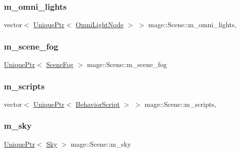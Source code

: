 \subsubsection{\texorpdfstring{m\+\_\+omni\+\_\+lights}{m\_omni\_lights}}
{\footnotesize\ttfamily vector$<$ \hyperlink{namespacemage_a3316d7143a973e37adf1110f2e80ca31}{Unique\+Ptr}$<$ \hyperlink{namespacemage_a1724c6e6b6b5ba535cdd967cbbb4a669}{Omni\+Light\+Node} $>$ $>$ mage\+::\+Scene\+::m\+\_\+omni\+\_\+lights\hspace{0.3cm}{\ttfamily [mutable]}, {\ttfamily [private]}}

\hypertarget{classmage_1_1_scene_a58f8d29322664c4c5895703a6cbc9000}{}\label{classmage_1_1_scene_a58f8d29322664c4c5895703a6cbc9000} 
\subsubsection{\texorpdfstring{m\+\_\+scene\+\_\+fog}{m\_scene\_fog}}
{\footnotesize\ttfamily \hyperlink{namespacemage_a3316d7143a973e37adf1110f2e80ca31}{Unique\+Ptr}$<$ \hyperlink{classmage_1_1_scene_fog}{Scene\+Fog} $>$ mage\+::\+Scene\+::m\+\_\+scene\+\_\+fog\hspace{0.3cm}{\ttfamily [private]}}

\hypertarget{classmage_1_1_scene_abdda0e08ff976b6697ef8fcc0a53f72e}{}\label{classmage_1_1_scene_abdda0e08ff976b6697ef8fcc0a53f72e} 
\subsubsection{\texorpdfstring{m\+\_\+scripts}{m\_scripts}}
{\footnotesize\ttfamily vector$<$ \hyperlink{namespacemage_a3316d7143a973e37adf1110f2e80ca31}{Unique\+Ptr}$<$ \hyperlink{classmage_1_1_behavior_script}{Behavior\+Script} $>$ $>$ mage\+::\+Scene\+::m\+\_\+scripts\hspace{0.3cm}{\ttfamily [mutable]}, {\ttfamily [private]}}

\hypertarget{classmage_1_1_scene_a90163a34ed39216b14175c4b799abd46}{}\label{classmage_1_1_scene_a90163a34ed39216b14175c4b799abd46} 
\subsubsection{\texorpdfstring{m\+\_\+sky}{m\_sky}}
{\footnotesize\ttfamily \hyperlink{namespacemage_a3316d7143a973e37adf1110f2e80ca31}{Unique\+Ptr}$<$ \hyperlink{classmage_1_1_sky}{Sky} $>$ mage\+::\+Scene\+::m\+\_\+sky\hspace{0.3cm}{\ttfamily [private]}}

